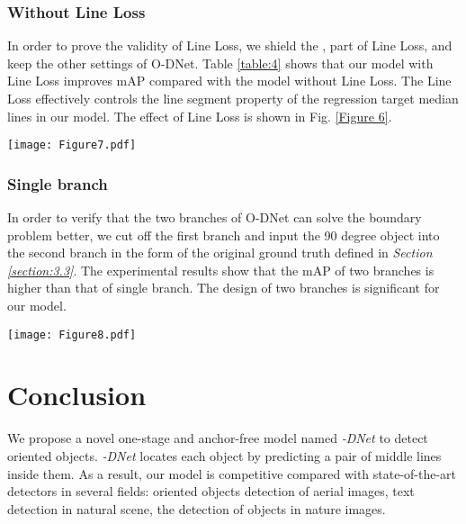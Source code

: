 \documentclass[runningheads]{llncs}
\begin{document}
\subsubsection{Without Line Loss}

In order to prove the validity of Line Loss, we shield the ,  part of Line Loss, and keep the other settings of O-DNet. Table \ref{table:4} shows that our model with Line Loss improves  mAP compared with the model without Line Loss. The Line Loss effectively controls the line segment property of the regression target median lines in our model. The effect of Line Loss is shown in Fig. \ref{Figure 6}.

\begin{figure*}[!h]
	\centering
	\texttt{[image: Figure7.pdf]}
\caption{Effects of Line Loss. Figure (a) shows the output of our model with Line Loss and Figure (b) shows the result of our model without Line Loss.} 
	\label{Figure 6}
\end{figure*}

\subsubsection{Single branch}

In order to verify that the two branches of O-DNet can solve the boundary problem better, we cut off the first branch and input the 90 degree object into the second branch in the form of the original ground truth defined in {\color{red}\textit{Section \ref{section:3.3}}}. The experimental results show that the mAP of two branches is  higher than that of single branch. The design of two branches is significant for our model.



\begin{figure*}[!h]
	\centering
	\texttt{[image: Figure8.pdf]}
\caption{Qualitative results output by O-DNet.} 
	\label{Figure 7}
\end{figure*}





\section{Conclusion} \label{section:5}

We propose a novel one-stage and anchor-free model named \textit{-DNet} to detect oriented objects. \textit{-DNet} locates each object by predicting a pair of middle lines inside them. As a result, our model is competitive compared with state-of-the-art detectors in several fields: oriented objects detection of aerial images, text detection in natural scene, the detection of objects in nature images.



\end{document}
